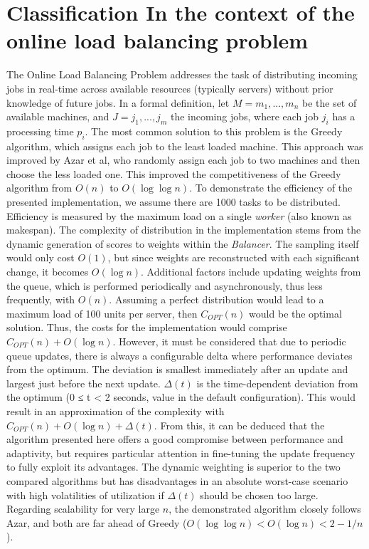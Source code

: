 \documentclass[twocolumn]{webofc}
\begin{document}
\section{Classification In the context of the online load balancing problem}
The Online Load Balancing Problem addresses the task of distributing incoming jobs in real-time across available resources (typically servers) without prior knowledge of future jobs. In a formal definition, let \( M = {m_1, ..., m_n} \) be the set of available machines, and \( J = {j_1, ..., j_m} \) the incoming jobs, where each job $j_i$ has a processing time $p_i$. The most common solution to this problem is the Greedy algorithm, which assigns each job to the least loaded machine\cite{black2020greedy}. This approach was improved by Azar et al, who randomly assign each job to two machines and then choose the less loaded one\cite{AZAR199473}. This improved the competitiveness of the Greedy algorithm from $O(n)$ to $O(\log \log n)$. To demonstrate the efficiency of the presented implementation, we assume there are 1000 tasks to be distributed. Efficiency is measured by the maximum load on a single \textit{worker} (also known as makespan). The complexity of distribution in the implementation stems from the dynamic generation of scores to weights within the \textit{Balancer}. The sampling itself would only cost $O(1)$, but since weights are reconstructed with each significant change, it becomes $O(\log n)$. Additional factors include updating weights from the queue, which is performed periodically and asynchronously, thus less frequently, with $O(n)$. Assuming a perfect distribution would lead to a maximum load of 100 units per server, then $C_{OPT}(n)$ would be the optimal solution. Thus, the costs for the implementation would comprise $C_{OPT}(n) + O(\log n)$. However, it must be considered that due to periodic queue updates, there is always a configurable delta where performance deviates from the optimum. The deviation is smallest immediately after an update and largest just before the next update. $\Delta(t)$ is the time-dependent deviation from the optimum (0 ≤ t < 2 seconds, value in the default configuration). This would result in an approximation of the complexity with $C_{OPT}(n) + O(\log n) + \Delta(t)$. From this, it can be deduced that the algorithm presented here offers a good compromise between performance and adaptivity, but requires particular attention in fine-tuning the update frequency to fully exploit its advantages. The dynamic weighting is superior to the two compared algorithms but has disadvantages in an absolute worst-case scenario with high volatilities of utilization if $\Delta(t)$ should be chosen too large. Regarding scalability for very large $n$, the demonstrated algorithm closely follows Azar, and both are far ahead of Greedy ($O(\log \log n) < O(\log n) < 2 - 1/n$).
\end{document}
